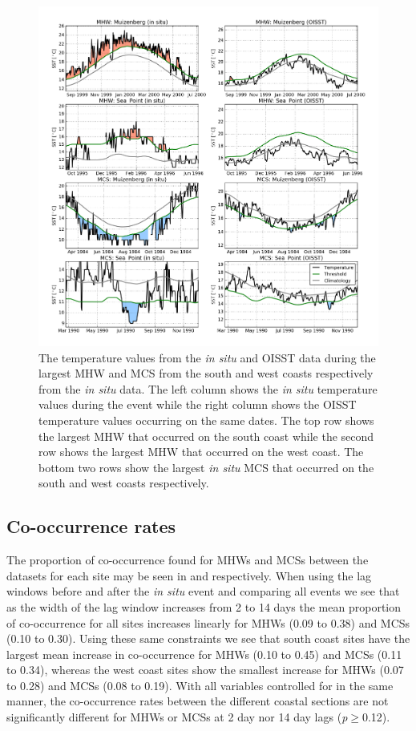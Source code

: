 \documentclass[a4paper,10pt,review]{elsarticle}
\begin{document}
\begin{figure}
\centering
\includegraphics[width=1.0\textwidth]{figure3.png}
\caption{The temperature values from the \emph{in situ} and OISST data during the largest MHW and MCS from the south and west coasts respectively from the \emph{in situ} data. The left column shows the \emph{in situ} temperature values during the event while the right column shows the OISST temperature values occurring on the same dates. The top row shows the largest MHW that occurred on the south coast while the second row shows the largest MHW that occurred on the west coast. The bottom two rows show the largest \emph{in situ} MCS that occurred on the south and west coasts respectively.}
\label{fig:Figure3}
\end{figure}

\subsection{Co-occurrence rates}
The proportion of co-occurrence found for MHWs and MCSs between the datasets for each site may be seen in  and  respectively. When using the lag windows before and after the \emph{in situ} event and comparing all events we see that as the width of the lag window increases from 2 to 14 days the mean proportion of co-occurrence for all sites increases linearly for MHWs (0.09 to 0.38) and MCSs (0.10 to 0.30). Using these same constraints we see that south coast sites have the largest mean increase in co-occurrence for MHWs (0.10 to 0.45) and MCSs (0.11 to 0.34), whereas the west coast sites show the smallest increase for MHWs (0.07 to 0.28) and MCSs (0.08 to 0.19). With all variables controlled for in the same manner, the co-occurrence rates between the different coastal sections are not significantly different for MHWs or MCSs at 2 day nor 14 day lags (\emph{p}$\geq$0.12).
\end{document}
